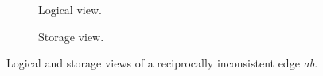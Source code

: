 \begin{figure}[htp]
  \centering
  \begin{subfigure}{\linewidth}
    \centering
    
    \caption{Logical view.}
    \label{hc-edge}
  \end{subfigure}
  \begin{subfigure}{\linewidth}
    \vspace{2ex}
    \centering
    
    \caption{Storage view.}
    \label{hc-db-rep}
  \end{subfigure}%
  \caption{Logical and storage views of a reciprocally inconsistent edge \emph{ab}.}
  \label{hc}
\end{figure}